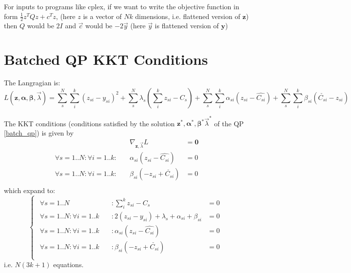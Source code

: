 \documentclass[11 pt]{article}
\begin{document}
For inputs to programs like cplex, if we want to write the objective function in form $\frac{1}{2}z^T Q z + c^Tz$, (here $z$ is a vector of $Nk$ dimensions, i.e. flattened version of $\bm{z}$) then $Q$ would be $2I$ and $\vec{c}$ would be $-2\vec{y}$ (here $\vec{y}$ is flattened version of $\bm{y}$)


\section{Batched QP KKT Conditions}

The Langragian is:
\begin{equation}
    L(\bm{z},\bm{\alpha},\bm{\beta},\vec{\lambda}) = \sum_s^N \sum_i^k (z_{si}-y_{si})^2 + \sum_s^N \lambda_s (\sum_i^k z_{si} - C_s) + \sum_s^N \sum_i^k \alpha_{si}(z_{si} - \hat{C_{si}}) + \sum_s^N \sum_i^k \beta_{si}(\check{C_{si}} - z_{si})
\end{equation}

The KKT conditions (conditions satisfied by the solution $\bm{z}^*, \bm{\alpha}^*, \bm{\beta}^* \vec{\lambda}^*$ of the QP \ref{batch_qp}) is given by
\begin{align*}
    &\nabla_{\bm{z},\vec{\lambda}} L & = \bm{0} \\
    \forall s=1..N: \forall i=1..k: \quad &\alpha_{si}(z_{si} - \hat{C_{si}}) & = 0 \\
    \forall s=1..N: \forall i=1..k: \quad &\beta_{si}(-z_{si} + \check{C_{si}}) & = 0 \\
\end{align*}
which expand to:
\begin{equation}\label{eqns_batch_kkt}
    \begin{cases}
        \begin{aligned}
            \forall s=1..N &: \sum_i^k z_{si} - C_s & = 0 \\
            \forall s=1..N : \forall i=1..k \quad &: 2(z_{si}-y_{si}) + \lambda_s + \alpha_{si} + \beta_{si} & = 0 \\
            \forall s=1..N : \forall i=1..k \quad &: \alpha_{si}(z_{si} - \hat{C_{si}}) & = 0 \\
            \forall s=1..N : \forall i=1..k \quad &: \beta_{si}(-z_{si} + \check{C_{si}}) & = 0 \\
        \end{aligned}
    \end{cases}
\end{equation}
i.e. $N(3k+1)$ equations.
\end{document}
